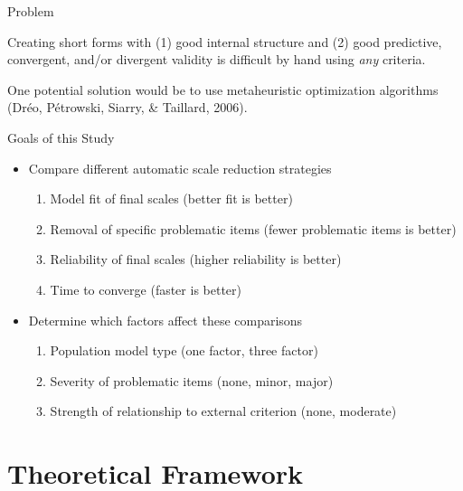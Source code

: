 \documentclass[ignorenonframetext,]{beamer}
\providecommand{\tightlist}{%
  \setlength{\itemsep}{0pt}\setlength{\parskip}{0pt}}
\begin{document}
\begin{frame}{Problem}
\protect\hypertarget{problem}{}

Creating short forms with (1) good internal structure and (2) good
predictive, convergent, and/or divergent validity is difficult by hand
using \emph{any} criteria.

One potential solution would be to use metaheuristic optimization
algorithms (Dréo, Pétrowski, Siarry, \& Taillard, 2006).

\end{frame}

\begin{frame}{Goals of this Study}
\protect\hypertarget{goals-of-this-study}{}

\begin{itemize}
\tightlist
\item
  Compare different automatic scale reduction strategies

  \begin{enumerate}
  \tightlist
  \item
    Model fit of final scales (better fit is better)
  \item
    Removal of specific problematic items (fewer problematic items is
    better)
  \item
    Reliability of final scales (higher reliability is better)
  \item
    Time to converge (faster is better)
  \end{enumerate}
\item
  Determine which factors affect these comparisons

  \begin{enumerate}
  \tightlist
  \item
    Population model type (one factor, three factor)
  \item
    Severity of problematic items (none, minor, major)
  \item
    Strength of relationship to external criterion (none, moderate)
  \end{enumerate}
\end{itemize}

\end{frame}

\hypertarget{theoretical-framework}{%
\section{Theoretical Framework}\label{theoretical-framework}}
\end{document}
